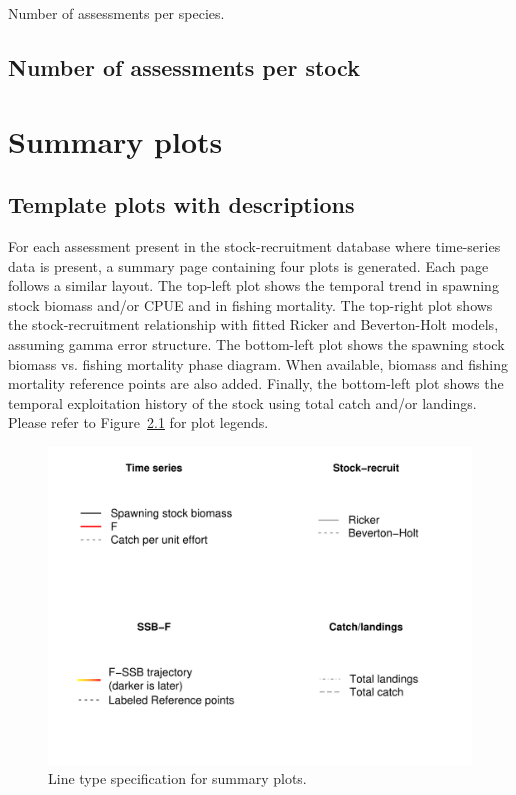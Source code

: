 \documentclass[a4paper,10pt,oneside]{book}
\begin{document}
\begin{table}[htbp]
\caption{Number of assessments per species.}
\begin{scriptsize}
\end{scriptsize}
\end{table}

\newpage
\section{Number of assessments per stock}


\chapter{Summary plots}

\section{Template plots with descriptions}
For each assessment present in the stock-recruitment database where time-series data is present, a summary page containing four plots is generated. Each page follows a similar layout. The top-left plot shows the temporal trend in spawning stock biomass and/or CPUE and in fishing mortality. The top-right plot shows the stock-recruitment relationship with fitted Ricker and Beverton-Holt models, assuming gamma error structure. The bottom-left plot shows the spawning stock biomass vs. fishing mortality phase diagram. When available, biomass and fishing mortality reference points are also added. Finally, the bottom-left plot shows the temporal exploitation history of the stock using total catch and/or landings. Please refer to Figure~\ref{fig:legend} for plot legends.

\begin{center}
\begin{figure}\label{fig:legend}
\includegraphics[width=1.2\textwidth]{../R/report_legend.pdf}
\caption{Line type specification for summary plots.}
\end{figure}

\end{center}
\end{document}
